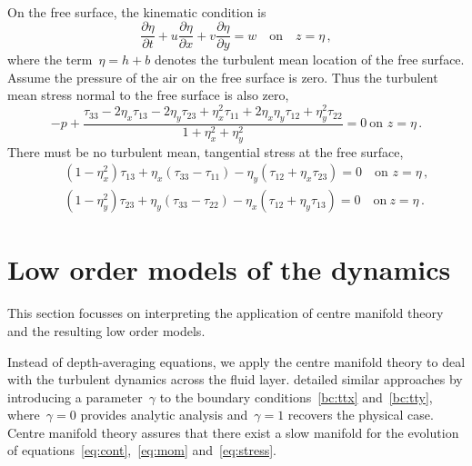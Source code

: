 \documentclass[12pt,a5paper]{article}
\begin{document}
\\
On the free surface, the kinematic condition is 
\begin{equation}
 \frac{\partial\eta}{\partial t}+u\frac{\partial\eta}{\partial x}+v\frac{\partial\eta}{\partial y}=w\quad\text{on}\quad z=\eta\,,
\end{equation}
where the term~$\eta=h+b$ denotes the turbulent mean location of the free surface. Assume the pressure of the air on the free surface is zero. Thus the turbulent mean stress normal to the free surface is also zero,
\begin{equation}
    -p+\frac{\tau_{33} -2\eta_x\tau_{13} -2\eta_y\tau_{23}
    +\eta_x^2\tau_{11} +2\eta_x\eta_y\tau_{12}+\eta_y^2\tau_{22}}
    {1+\eta_x^2+\eta_y^2}
     =0 \ \text{on }
    z=\eta\,.
    \label{bc:ttz}
\end{equation}
There must be no turbulent mean, tangential stress at the free surface,
\begin{eqnarray}&&
    (1-\eta_x^2)\tau_{13}+\eta_x(\tau_{33}-\tau_{11})-\eta_y(\tau_{12}+\eta_x\tau_{23})=0
    \quad\text{on } z=\eta\,,
    \label{bc:ttx} \\&&
    (1-\eta_y^2)\tau_{23}+\eta_y(\tau_{33}-\tau_{22})
    -\eta_x(\tau_{12}+\eta_y\tau_{13})=0
    \quad\text{on}\ z=\eta\,.
    \label{bc:tty}
\end{eqnarray}




\section{Low order models of the dynamics}
\label{low-order}

This section focusses on interpreting the application of centre manifold theory and the resulting low order models.

Instead of depth-averaging equations, we apply the centre manifold theory to deal with the turbulent dynamics across the fluid layer. \cite{Roberts2008,Georgiev2008} detailed similar approaches by introducing a parameter~$\gamma$ to the boundary conditions~\eqref{bc:ttx} and~\eqref{bc:tty}, where~$\gamma=0$ provides analytic analysis and~$\gamma=1$ recovers the physical case. Centre manifold theory assures that there exist a slow manifold for the evolution of equations~\eqref{eq:cont},~\eqref{eq:mom} and~\eqref{eq:stress}.
 
\end{document}
